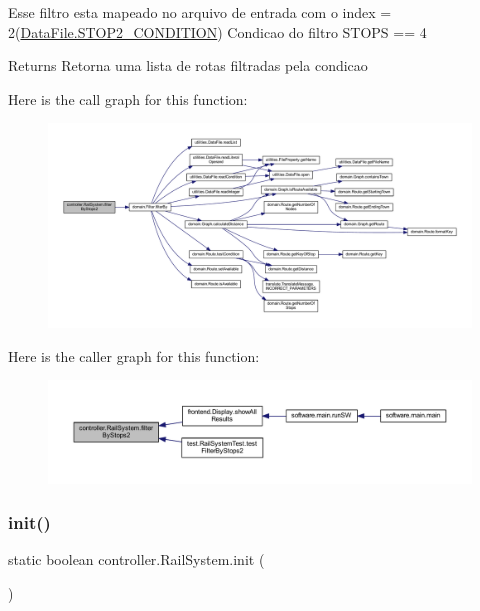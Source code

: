 Esse filtro esta mapeado no arquivo de entrada com o index = 2(\hyperlink{classutilities_1_1_data_file_afdb877fcbb93d5bf2e6757f844c0a0e0}{Data\+File.\+S\+T\+O\+P2\+\_\+\+C\+O\+N\+D\+I\+T\+I\+ON}) Condicao do filtro S\+T\+O\+PS == 4

\begin{DoxyReturn}{Returns}
Retorna uma lista de rotas filtradas pela condicao 
\end{DoxyReturn}
Here is the call graph for this function\+:\nopagebreak
\begin{figure}[H]
\begin{center}
\leavevmode
\includegraphics[width=350pt]{classcontroller_1_1_rail_system_aac5dfeee25bd54a9a4bbdb64d52acf9f_cgraph}
\end{center}
\end{figure}
Here is the caller graph for this function\+:\nopagebreak
\begin{figure}[H]
\begin{center}
\leavevmode
\includegraphics[width=350pt]{classcontroller_1_1_rail_system_aac5dfeee25bd54a9a4bbdb64d52acf9f_icgraph}
\end{center}
\end{figure}
\mbox{\label{classcontroller_1_1_rail_system_aaa1ab4d489fd21a5e968723c2afd89b2}} 
\subsubsection{\texorpdfstring{init()}{init()}}
{\footnotesize\ttfamily static boolean controller.\+Rail\+System.\+init (\begin{DoxyParamCaption}{ }\end{DoxyParamCaption})\hspace{0.3cm}{\ttfamily [static]}}

